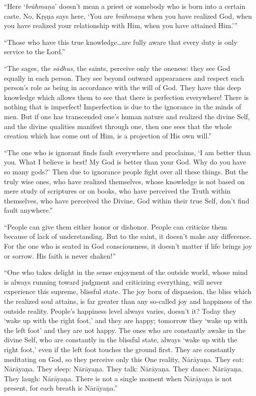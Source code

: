 \enquote{Here \enquote{\textit{brāhmaṇa}} doesn’t mean a priest or somebody who is born into a certain caste. No, Kṛṣṇa says here, \enquote{You are \textit{brāhmaṇa} when you have realized God, when you have realized your relationship with Him, when you have attained Him.}}

\enquote{Those who have this true knowledge\ldots are fully aware that every duty is only service to the Lord.}

\enquote{The sages, the \textit{sādhus}, the saints, perceive only the oneness: they see God equally in each person. They see beyond outward appearances and respect each person’s role as being in accordance with the will of God. They have this deep knowledge which allows them to see that there is perfection everywhere! There is nothing that is imperfect! Imperfection is due to the ignorance in the minds of men. But if one has transcended one’s human nature and realized the divine Self, and the divine qualities manifest through one, then one sees that the whole creation which has come out of Him, is a projection of His own will.}

\enquote{The one who is ignorant finds fault everywhere and proclaims, \enquote{I am better than you. What I believe is best! My God is better than your God. Why do you have so many gods?} Then due to ignorance people fight over all these things. But the truly wise ones, who have realized themselves, whose knowledge is not based on mere study of scriptures or on books, who have perceived the Truth within themselves, who have perceived the Divine, God within their true Self, don’t find fault anywhere.}

\enquote{People can give them either honor or dishonor. People can criticize them because of lack of understanding. But to the saint, it doesn’t make any difference. For the one who is seated in God consciousness, it doesn’t matter if life brings joy or sorrow. His faith is never shaken!}

\enquote{One who takes delight in the sense enjoyment of the outside world, whose mind is always running toward judgment and criticizing everything, will never experience this supreme, blissful state. The joy born of dispassion, the bliss which the realized soul attains, is far greater than any so-called joy and happiness of the outside reality. People’s happiness level always varies, doesn’t it? Today they \enquote{wake up with the right foot,} and they are happy; tomorrow they \enquote{wake up with the left foot} and they are not happy. The ones who are constantly awake in the divine Self, who are constantly in the blissful state, always \enquote{wake up with the right foot,} even if the left foot touches the ground first. They are constantly meditating on God, so they perceive only this One reality, Nārāyaṇa. They eat: Nārāyaṇa. They sleep: Nārāyaṇa. They talk: Nārāyaṇa. They dance: Nārāyaṇa. They laugh: Nārāyaṇa. There is not a single moment when Nārāyaṇa is not present, for each breath is Nārāyaṇa.}

